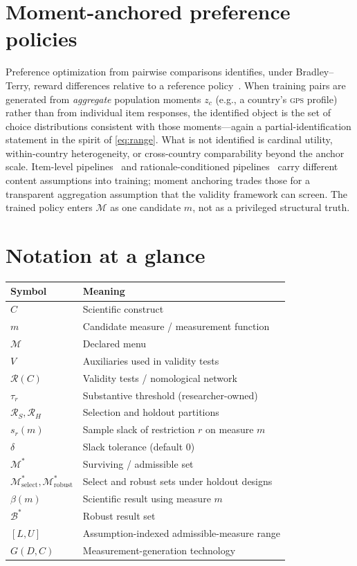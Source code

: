 \documentclass[10pt,letterpaper]{article}
\newcommand{\GPS}{\textsc{gps}}
\newcommand{\M}{\ensuremath{\mathcal{M}}}
\newcommand{\Rset}{\mathcal{R}}
\newcommand{\Bset}{\mathcal{B}}
\begin{document}
\section{Moment-anchored preference policies}
\label{app:moment}
Preference optimization from pairwise comparisons identifies, under Bradley--Terry, reward differences relative to a reference policy~\cite{bradley1952,rafailov2023}.
When training pairs are generated from \emph{aggregate} population moments $z_c$ (e.g., a country's \GPS{} profile) rather than from individual item responses, the identified object is the set of choice distributions consistent with those moments---again a partial-identification statement in the spirit of \eqref{eq:range}.
What is not identified is cardinal utility, within-country heterogeneity, or cross-country comparability beyond the anchor scale.
Item-level pipelines~\cite{plural2026} and rationale-conditioned pipelines~\cite{palms2026} carry different content assumptions into training; moment anchoring trades those for a transparent aggregation assumption that the validity framework can screen.
The trained policy enters $\M$ as one candidate $m$, not as a privileged structural truth.

\section{Notation at a glance}
\label{app:notation}
\begin{center}
\small
\begin{tabular}{@{}ll@{}}
\toprule
Symbol & Meaning \\
\midrule
$C$ & Scientific construct \\
$m$ & Candidate measure / measurement function \\
$\M$ & Declared menu \\
$V$ & Auxiliaries used in validity tests \\
$\Rset(C)$ & Validity tests / nomological network \\
$\tau_r$ & Substantive threshold (researcher-owned) \\
$\Rset_S,\Rset_H$ & Selection and holdout partitions \\
$s_r(m)$ & Sample slack of restriction $r$ on measure $m$ \\
$\delta$ & Slack tolerance (default $0$) \\
$\M^*$ & Surviving / admissible set \\
$\M^*_{\mathrm{select}},\M^*_{\mathrm{robust}}$ & Select and robust sets under holdout designs \\
$\beta(m)$ & Scientific result using measure $m$ \\
$\Bset^*$ & Robust result set \\
$[L,U]$ & Assumption-indexed admissible-measure range \\
$G(D,C)$ & Measurement-generation technology \\
\bottomrule
\end{tabular}
\end{center}
\end{document}
